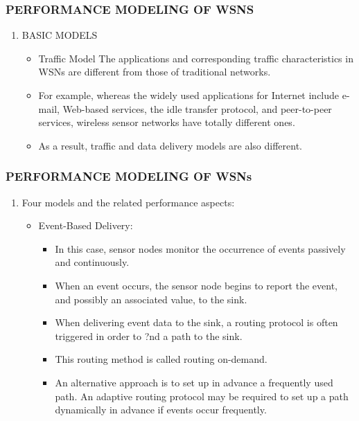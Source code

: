 \documentclass[11pt]{beamer}
\begin{document}
			\begin{frame}
				\frametitle{PERFORMANCE MODELING OF WSNS}
				\begin{enumerate}
					\item BASIC MODELS
					\begin{itemize}
						\item Traffic Model The applications and corresponding traffic characteristics in WSNs are different from those of traditional networks. 
						\item For example, whereas the widely used applications for Internet include e-mail, Web-based services, the idle transfer protocol, and peer-to-peer services, wireless sensor networks have totally different ones.
						\item As a result, traffic and data delivery models are also different.
					\end{itemize}
					
				\end{enumerate}
			\end{frame}
			\begin{frame}
				
				\frametitle{PERFORMANCE MODELING OF WSNs}
				\begin{enumerate}
					\item Four models and the related performance aspects:
					\begin{itemize}
						\item Event-Based Delivery:
						       \begin{itemize}
						       	\item
						       	In this case, sensor nodes monitor the occurrence of events passively and continuously.
						       	\item When an event occurs, the sensor node begins to report the event, and possibly an associated value, to the sink.
						       	\item When delivering event data to the sink, a routing protocol is often triggered in order to ?nd a path to the sink.
						       	\item This routing method is called routing on-demand.
						       	\item An  alternative approach is to set up in advance a frequently used path. An adaptive routing protocol may be required to set up a path dynamically in advance if events occur frequently.
						       \end{itemize}
				\end{itemize}
			\end{enumerate}
			\end{frame}
\end{document}
